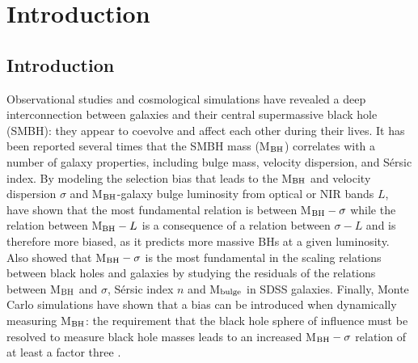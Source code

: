 \chapter{Introduction}



\section{Introduction}
Observational studies and cosmological simulations have revealed a deep interconnection between galaxies and their central supermassive black hole (SMBH): they appear to coevolve and affect each other during their lives.
It has been reported several times that the SMBH mass (M$_{\rm BH}$) correlates with a number of galaxy properties, including bulge mass, velocity dispersion, and S\'{e}rsic index. %
By modeling the selection bias that leads to the M$_{\rm BH}$ and velocity dispersion $\sigma$ and M$_{\rm BH}$-galaxy bulge luminosity from optical or NIR bands $L$, \citet{2007ApJ...660..267B} have shown that the most fundamental relation is between M$_{\rm BH}-\sigma$ while the relation between M$_{\rm BH}- L$ is a consequence of a relation between $\sigma-L$ and is therefore more biased, as it predicts more massive BHs at a given luminosity. Also \citet{2017MNRAS.466.4029S} showed that M$_{\rm BH}-\sigma$ is the most fundamental in the scaling relations between black holes and galaxies by studying the residuals of the relations between M$_{\rm BH}$ and $\sigma$, S\'{e}rsic index $n$ and M$_{\rm bulge}$ in SDSS galaxies. Finally, Monte Carlo simulations have shown that a bias can be introduced when dynamically measuring M$_{\rm BH}$: the requirement that the black hole sphere of influence must be resolved to measure black hole masses leads to an increased M$_{\rm BH}-\sigma$ relation of at least a factor three \citep{2016MNRAS.460.3119S}.
